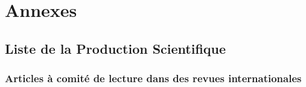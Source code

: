 \documentclass[
  11pt,
]{article}
\begin{document}
\appendix

\hypertarget{annexes}{%
\section*{Annexes}\label{annexes}}

\hypertarget{articles}{%
\subsection{Liste de la Production Scientifique}\label{articles}}

\hypertarget{articles-uxe0-comituxe9-de-lecture-dans-des-revues-internationales}{%
\subsubsection{Articles à comité de lecture dans des revues
internationales}\label{articles-uxe0-comituxe9-de-lecture-dans-des-revues-internationales}}
\end{document}
